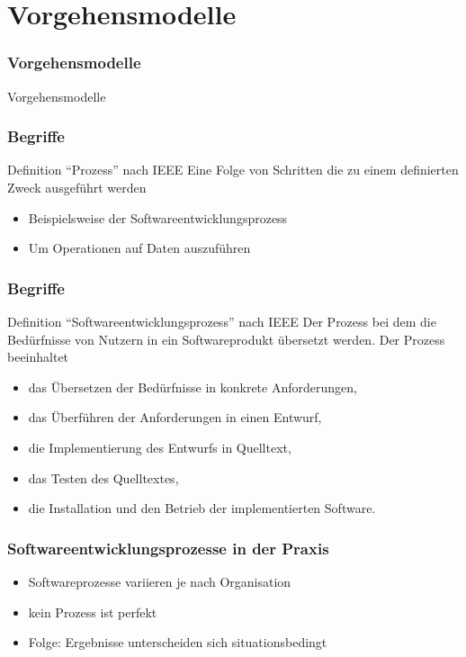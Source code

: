 \section{Vorgehensmodelle}
\begin{frame}[fragile]
\frametitle{Vorgehensmodelle}
\huge Vorgehensmodelle
\end{frame}

\begin{frame}
\frametitle{Begriffe}
	\begin{block}{Definition ``Prozess'' nach IEEE}
		Eine Folge von Schritten die zu einem definierten Zweck ausgeführt werden
		\begin{itemize}
			\item Beispielsweise der Softwareentwicklungsprozess
			\item Um Operationen auf Daten auszuführen
		\end{itemize}
	\end{block}	
\end{frame}

\begin{frame}
\frametitle{Begriffe}
	\begin{block}{Definition ``Softwareentwicklungsprozess'' nach IEEE}
		Der Prozess bei dem die Bedürfnisse von Nutzern in ein Softwareprodukt übersetzt werden.
		Der Prozess beeinhaltet
		\begin{itemize}
			\item das Übersetzen der Bedürfnisse in konkrete Anforderungen,
			\item das Überführen der Anforderungen in einen Entwurf,
			\item die Implementierung des Entwurfs in Quelltext,
			\item das Testen des Quelltextes,
			\item die Installation und den Betrieb der implementierten Software.
		\end{itemize}
	\end{block}	
\end{frame}

\begin{frame}
\frametitle{Softwareentwicklungsprozesse in der Praxis}
\begin{itemize}
	\item Softwareprozesse variieren je nach Organisation
	\item kein Prozess ist perfekt
	\item Folge: Ergebnisse unterscheiden sich situationsbedingt
\end{itemize}
\end{frame}

